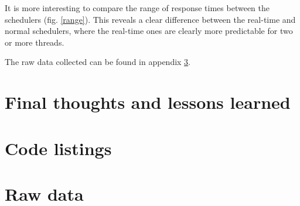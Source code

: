 \documentclass[12pt, a4paper]{article} %
\begin{document}
It is more interesting to compare the range of response times between the schedulers (fig. \ref{range}).
This reveals a clear difference between the real-time and normal schedulers, where the real-time ones are clearly more predictable for two or more threads.

The raw data collected can be found in appendix \ref{raw}.












\section{Final thoughts and lessons learned}

\pagebreak
\appendix

\section{Code listings}









\section{Raw data}\label{raw}




\end{document}

